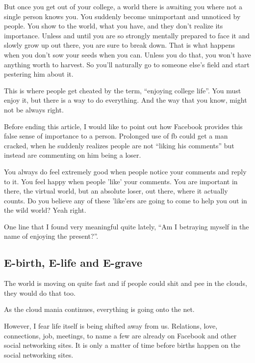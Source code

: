 \documentclass[twoside,11pt]{article}
\begin{document}
But once you get out of your college, a world there is awaiting you where not a single person knows you. You suddenly become unimportant and unnoticed by people. You show to the world, what you have, and they don't realize its importance. Unless and until you are so strongly mentally prepared to face it and slowly grow up out there, you are sure to break down. That is what happens when you don't sow your seeds when you can. Unless you do that, you won't have anything worth to harvest. So you'll naturally go to someone else's field and start pestering him about it.

This is where people get cheated by the term, ``enjoying college life''. You must enjoy it, but there is a way to do everything. And the way that you know, might not be always right.

Before ending this article, I would like to point out how Facebook provides this false sense of importance to a person. Prolonged use of fb could get a man cracked, when he suddenly realizes people are not ``liking his comments'' but instead are commenting on him being a loser.

You always do feel extremely good when people notice your comments and reply to it. You feel happy when people 'like' your comments. You are important in there, the virtual world, but an absolute loser, out there, where it actually counts. Do you believe any of these 'like'ers are going to come to help you out in the wild world? Yeah right.

One line that I found very meaningful quite lately, ``Am I betraying myself in the name of enjoying the present?''.

\newpage
\begin{center}
  \section{E-birth, E-life and E-grave}
\end{center}
\bigskip
\bigskip
\bigskip

The world is moving on quite fast and if people could shit and pee in the clouds, they would do that too.

As the cloud mania continues, everything is going onto the net.

However, I fear life itself is being shifted away from us. Relations, love, connections, job, meetings, to name a few are already on Facebook and other social networking sites. It is only a matter of time before births happen on the social networking sites.
\end{document}
